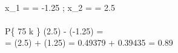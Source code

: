 \\ x_{1} =  = -1.25
\; \; ; \; \;
x_{2} =  = 2.5
\\
\\ P\left \{ 75 \leqslant k  \right \} \approx \Phi (2.5) - \Phi(-1.25) =
\\ = \Phi (2.5) + \Phi(1.25) = 0.49379 + 0.39435 = 0.89
